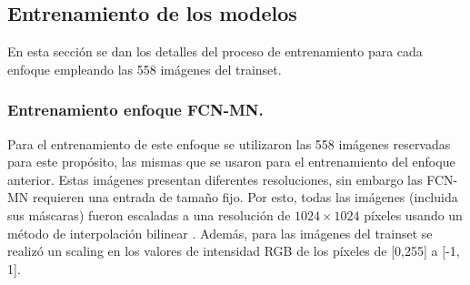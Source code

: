 \documentclass[a4paper,authoryear,review]{elsarticle}
\begin{document}
\subsection{Entrenamiento de los modelos} 
\label{sec:train}

En esta sección se dan los detalles del proceso de entrenamiento para cada enfoque empleando las 558 imágenes del trainset.



\subsubsection{Entrenamiento enfoque FCN-MN.} 
\label{sec:fcntrain}

Para el entrenamiento de este enfoque se utilizaron las 558 imágenes reservadas para este propósito, las mismas que se usaron para el entrenamiento del enfoque anterior. Estas imágenes presentan diferentes resoluciones, sin embargo las FCN-MN requieren una entrada de tamaño fijo. Por esto, todas las imágenes (incluida sus máscaras) fueron escaladas a una resolución de $1024 \times 1024$ píxeles usando un método de interpolación bilinear \citep{han2013comparison}. Además, para las imágenes del trainset se realizó un scaling en los valores de intensidad RGB de los píxeles de [0,255] a [-1, 1].
\end{document}
